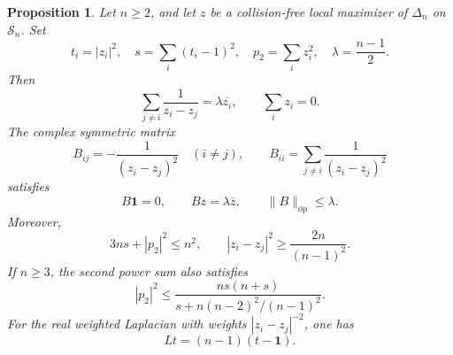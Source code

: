 \documentclass[11pt]{article}
\newtheorem{proposition}[theorem]{Proposition}
\theoremstyle{remark}
\newcommand{\one}{\mathbf 1}
\newcommand{\norm}[1]{\lVert#1\rVert}
\newcommand{\op}{\mathrm{op}}
\numberwithin{equation}{section}
\begin{document}
\begin{proposition}\label{prop:general}
Let $n\ge2$, and let $z$ be a collision-free local maximizer of
$\Delta_n$ on $\mathcal S_n$. Set
\[
 t_i=|z_i|^2,\quad s=\sum_i(t_i-1)^2,\quad
 p_2=\sum_i z_i^2,\quad \lambda=\frac{n-1}{2}.
\]
Then
\begin{equation}\label{eq:stationary-general}
 \sum_{j\ne i}\frac1{z_i-z_j}=\lambda\overline{z_i},
 \qquad \sum_i z_i=0.
\end{equation}
The complex symmetric matrix
\begin{equation}\label{eq:B}
 B_{ij}=-\frac1{(z_i-z_j)^2}\quad(i\ne j),\qquad
 B_{ii}=\sum_{j\ne i}\frac1{(z_i-z_j)^2}
\end{equation}
satisfies
\begin{equation}\label{eq:B-general}
 B\one=0,\qquad Bz=\lambda\overline z,\qquad
 \norm{B}_{\op}\le\lambda.
\end{equation}
Moreover,
\begin{equation}\label{eq:radial-general}
 3ns+|p_2|^2\le n^2,\qquad
 |z_i-z_j|^2\ge\frac{2n}{(n-1)^2}.
\end{equation}
If $n\ge3$, the second power sum also satisfies
\begin{equation}\label{eq:power-radial}
 |p_2|^2\le
 \frac{ns(n+s)}{s+n(n-2)^2/(n-1)^2}.
\end{equation}
For the real weighted Laplacian with weights
$|z_i-z_j|^{-2}$, one has
\begin{equation}\label{eq:L-general}
 Lt=(n-1)(t-\one).
\end{equation}
\end{proposition}
\end{document}
